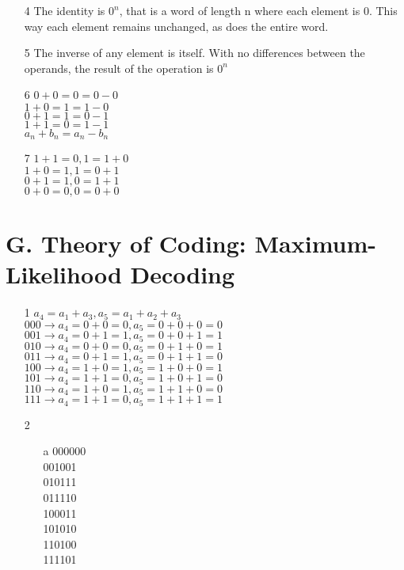 \begin{enumerate}
\begin{enumerate}
\item[4]
The identity is $0^n$, that is a word of length n where each element is 0. This way each element remains unchanged, as does the entire word. \\

\item[5]
The inverse of any element is itself. With no differences between the operands, the result of the operation is $0^n$ \\

\item[6]
$0+0=0=0-0$ \\
$1+0=1=1-0$ \\
$0+1=1=0-1$ \\
$1+1=0=1-1$ \\
$a_{n}+b_{n}=a_{n}-b_{n}$ \\

\item[7]
$1+1=0, 1=1+0$ \\
$1+0=1, 1=0+1$ \\
$0+1=1, 0=1+1$ \\
$0+0=0, 0=0+0$ \\

\end{enumerate}

\section*{G. Theory of Coding: Maximum-Likelihood Decoding}

\begin{enumerate}

\item[1]
$a_4=a_1+a_3, a_5=a_1+a_2+a_3$ \\
$000 \rightarrow a_4=0+0=0, a_5=0+0+0=0 $ \\
$001 \rightarrow a_4=0+1=1, a_5=0+0+1=1 $ \\
$010 \rightarrow a_4=0+0=0, a_5=0+1+0=1 $ \\
$011 \rightarrow a_4=0+1=1, a_5=0+1+1=0 $ \\
$100 \rightarrow a_4=1+0=1, a_5=1+0+0=1 $ \\
$101 \rightarrow a_4=1+1=0, a_5=1+0+1=0 $ \\
$110 \rightarrow a_4=1+0=1, a_5=1+1+0=0 $ \\
$111 \rightarrow a_4=1+1=0, a_5=1+1+1=1 $ \\

\item[2]
\begin{enumerate}
\item[a]
000000 \\
001001 \\
010111 \\
011110 \\
100011 \\
101010 \\
110100 \\
111101 \\


\end{enumerate}
\end{enumerate}
\end{enumerate}
